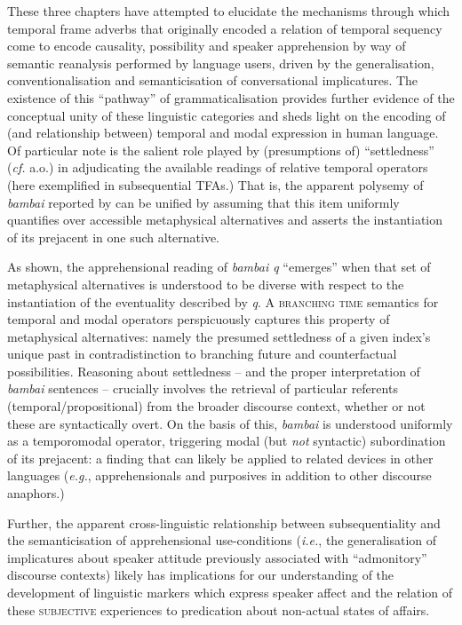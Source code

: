 These three chapters have attempted to elucidate the mechanisms through which temporal frame adverbs that originally encoded a relation of temporal sequency come to encode causality, possibility and speaker apprehension by way of semantic reanalysis performed by language users, driven by the generalisation, conventionalisation and semanticisation of conversational implicatures. The existence of this ``pathway'' of grammaticalisation provides further evidence of the conceptual unity of these linguistic categories and sheds light on the encoding of (and relationship between) temporal and modal expression in human language. Of particular note is the salient role played by (presumptions of) ``settledness'' (\textit{cf.} \citealp{Condoravdi2002,Kaufmann2005} a.o.) in adjudicating the available readings of relative temporal operators (here exemplified in subsequential TFAs.) That is, the apparent polysemy of \textit{bambai} reported by \citet{Angelo2016} can be unified by assuming that this item uniformly quantifies over accessible metaphysical  alternatives and asserts the instantiation of its prejacent in one such alternative.

As shown, the apprehensional reading of \textit{bambai q} ``emerges'' when that set of metaphysical alternatives is understood to be diverse with respect to the instantiation of the eventuality described by \textit{q}. A \textsc{branching time} semantics for temporal and modal operators perspicuously captures this property of metaphysical alternatives: namely the presumed settledness of a given index's unique past in contradistinction to branching future and counterfactual possibilities. Reasoning about settledness -- and the proper interpretation of \textit{bambai} sentences -- crucially involves the retrieval of particular referents (temporal/propositional) from the broader discourse context, whether or not these are syntactically overt. On the basis of this, \textit{bambai} is understood uniformly as a temporomodal operator, triggering modal (but \textit{not} syntactic) subordination of its prejacent: a finding that can likely be applied to related devices in other languages (\textit{e.g.}, apprehensionals and purposives in addition to other discourse anaphors.)

Further, the apparent cross-linguistic relationship between subsequentiality  and the semanticisation of apprehensional use-conditions (\textit{i.e.}, the generalisation of implicatures about speaker attitude previously associated with ``admonitory'' discourse contexts) likely has implications for our understanding of the development of linguistic markers which express speaker affect and the relation of these \textsc{subjective} experiences to predication about non-actual states of affairs.

